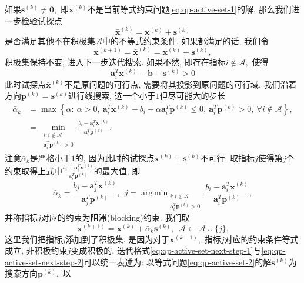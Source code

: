 \documentclass{SBCbookchapter}
\newcommand{\V}[1]{{\bm{#1}}}
\DeclareMathOperator*{\argmin}{arg\,min}
\numberwithin{equation}{section}
\begin{document}
如果$\V{s}^{(k)} \neq \V{0},$ 即$\V{x}^{(k)}$不是当前等式约束问题\eqref{eq:qp-active-set-1}的解, 那么我们进一步检验试探点
\begin{equation}
\label{eq:qp-active-set-test-point}
\bar{\V{x}}^{(k)} = \V{x}^{(k)} + \V{s}^{(k)}
\end{equation}
是否满足其他不在积极集$\mathcal{A}$中的不等式约束条件. 如果都满足的话, 我们令
\begin{equation}
\label{eq:qp-active-set-next-step-1}
\V{x}^{(k+1)} = \bar{\V{x}}^{(k)} = \V{x}^{(k)} + \V{s}^{(k)},
\end{equation}
积极集保持不变, 进入下一步迭代搜索. 如果不然, 即存在指标$i \not\in \mathcal{A},$ 使得
\begin{equation*}
\V{a}_i^T \V{x}^{(k)} - \V{b} + \V{s}^{(k)} > 0
\end{equation*}
此时试探点$\bar{\V{x}}^{(k)}$不是原问题的可行点, 需要将其投影到原问题的可行域. 我们沿着方向$\V{p}^{(k)} = \V{s}^{(k)}$进行线搜索, 选一个小于$1$但尽可能大的步长
\begin{equation}
\label{eq:qp-active-set-step-len-1}
\begin{aligned}
\bar{\alpha}_k & = \max \left\{ \alpha : ~ \alpha > 0, ~ \V{a}_i^T \V{x}^{(k)} - b_i + \alpha \V{a}_i^T \V{p}^{(k)} \leqslant 0, ~ \V{a}_i^T \V{p}^{(k)} > 0, ~ \forall i \not\in \mathcal{A} \right\}, \\
& = \min_{\substack{i: i \not\in \mathcal{A} \\ \V{a}_i^T \V{p}^{(k)} > 0}} \frac{b_i - \V{a}_i^T \V{x}^{(k)}}{\V{a}_i^T \V{p}^{(k)}}.
\end{aligned}
\end{equation}
注意$\bar{\alpha}_k$是严格小于$1$的, 因为此时的试探点$\V{x}^{(k)} + \V{s}^{(k)}$不可行. 取指标$j$使得第$j$个约束取得上式中$\frac{b_i - \V{a}_i^T \V{x}^{(k)}}{\V{a}_i^T \V{p}^{(k)}}$的最大值, 即
\begin{equation}
\label{eq:qp-active-set-step-len-2}
\bar{\alpha}_k = \frac{b_j - \V{a}_j^T \V{x}^{(k)}}{\V{a}_j^T \V{p}^{(k)}}, ~~ j = \argmin_{\substack{i: i \not\in \mathcal{A} \\ \V{a}_i^T \V{p}^{(k)} > 0}} \frac{b_i - \V{a}_i^T \V{x}^{(k)}}{\V{a}_i^T \V{p}^{(k)}},
\end{equation}
并称指标$j$对应的约束为阻滞(blocking)约束. 我们取
\begin{equation}
\label{eq:qp-active-set-next-step-2}
\V{x}^{(k+1)} = \V{x}^{(k)} + \bar{\alpha}_k \V{s}^{(k)}, ~~ \mathcal{A} \gets \mathcal{A} \cup \{ j \}.
\end{equation}
这里我们把指标$j$添加到了积极集, 是因为对于$\V{x}^{(k+1)},$ 指标$j$对应的约束条件等式成立, 非积极约束$j$变成积极的. 迭代格式\eqref{eq:qp-active-set-next-step-1}与\eqref{eq:qp-active-set-next-step-2}可以统一表述为: 以等式问题\eqref{eq:qp-active-set-2}的解$\V{s}^{(k)}$为搜索方向$\V{p}^{(k)},$ 以
\end{document}
